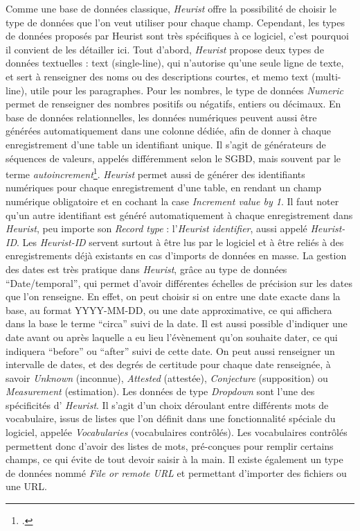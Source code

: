 Comme une base de données classique, \emph{Heurist} offre la possibilité de choisir le type de données que l'on veut utiliser pour chaque champ. Cependant, les types de données proposés par Heurist sont très spécifiques à ce logiciel, c'est pourquoi il convient de les détailler ici. Tout d'abord, \emph{Heurist} propose deux types de données textuelles : text (single-line), qui n'autorise qu'une seule ligne de texte, et sert à renseigner des noms ou des descriptions courtes, et memo text (multi-line), utile pour les paragraphes. Pour les nombres, le type de données \emph{Numeric} permet de renseigner des nombres positifs ou négatifs, entiers ou décimaux. En base de données relationnelles, les données numériques peuvent aussi être générées automatiquement dans une colonne dédiée, afin de donner à chaque enregistrement d'une table un identifiant unique. Il s'agit de générateurs de séquences de valeurs, appelés différemment selon le SGBD, mais souvent par le terme \emph{autoincrement}\footcite[p. 194]{Hainaut_2015}. \emph{Heurist} permet aussi de générer des identifiants numériques pour chaque enregistrement d'une table, en rendant un champ numérique obligatoire et en cochant la case \emph{Increment value by 1}. Il faut noter qu'un autre identifiant est généré automatiquement à chaque enregistrement dans \emph{Heurist}, peu importe son \emph{Record type} : l'\emph{Heurist identifier}, aussi appelé \emph{Heurist-ID}. Les \emph{Heurist-ID} servent surtout à être lus par le logiciel et à être reliés à des enregistrements déjà existants en cas d'imports de données en masse. La gestion des dates est très pratique dans \emph{Heurist}, grâce au type de données \enquote{Date/temporal}, qui permet d'avoir différentes échelles de précision sur les dates que l'on renseigne. En effet, on peut choisir si on entre une date exacte dans la base, au format YYYY-MM-DD, ou une date approximative, ce qui affichera dans la base le terme \enquote{circa} suivi de la date. Il est aussi possible d'indiquer une date avant ou après laquelle a eu lieu l'évènement qu'on souhaite dater, ce qui indiquera \enquote{before} ou \enquote{after} suivi de cette date. On peut aussi renseigner un intervalle de dates, et des degrés de certitude pour chaque date renseignée, à savoir \emph{Unknown} (inconnue), \emph{Attested} (attestée), \emph{Conjecture} (supposition) ou \emph{Measurement} (estimation). 
Les données de type \emph{Dropdown} sont l'une des spécificités d' \emph{Heurist}. Il s'agit d'un choix déroulant entre différents mots de vocabulaire, issus de listes que l'on définit dans une fonctionnalité spéciale du logiciel, appelée \emph{Vocabularies} (vocabulaires contrôlés). Les vocabulaires contrôlés permettent donc d'avoir des listes de mots, pré-conçues pour remplir certains champs, ce qui évite de tout devoir saisir à la main. Il existe également un type de données nommé \emph{File or remote URL} et permettant d'importer des fichiers ou une URL. 


